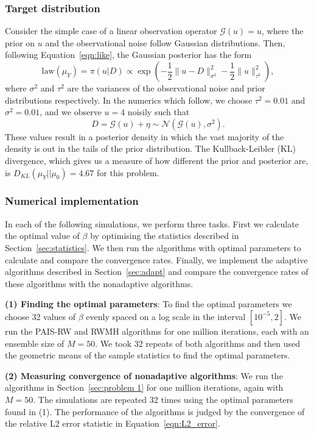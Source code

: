 \documentclass[final]{siamltex}
\newcommand{\G}{\mathcal{G}}
\begin{document}
\subsubsection{Target distribution}

Consider the simple case of a linear observation operator $\G(u) = u$, where the prior on $u$ and the observational noise follow Gaussian distributions. Then, following Equation~\ref{eqn:like}, the Gaussian posterior has the form
\begin{equation}\label{eqn:Gaussian posterior}
	\text{law}(\mu_Y) = \pi(u|D) \propto \exp\left(-\frac{1}{2}\big\|u - D\big\|^2_{\sigma^2} - \frac{1}{2}\big\|u\big\|^2_{\tau^2}\right),
\end{equation}
where $\sigma^2$ and $\tau^2$ are the variances of the
observational noise and prior distributions respectively. In the
numerics which follow, we choose $\tau^2 =0.01$ and $\sigma^2 = 0.01$, and
we observe $u=4$ noisily such that
\[
D = \mathcal{G}(u) + \eta \sim \mathcal{N}(\mathcal{G}(u),\sigma^2).
\]
These values result in a posterior density in which the vast majority
of the density is out in the tails of the
prior distribution. The Kullback-Leibler (KL)
divergence, which gives us a measure of how different the prior and
posterior are, is $D_{KL}(\mu_Y || \mu_0) = 4.67$ for this problem.

\subsubsection{Numerical implementation}\label{sec:Implementation P1}

In each of the following simulations, we perform three tasks. First we calculate the optimal value of $\beta$ by optimising the statistics described in Section~\ref{sec:statistics}. We then run the algorithms with optimal parameters to calculate and compare the convergence rates. Finally, we implement the adaptive algorithms described in Section~\ref{sec:adapt} and compare the convergence rates of these algorithms with the nonadaptive algorithms.

{\bf (1) Finding the optimal parameters}: To find the optimal
parameters we choose 32 values of $\beta$ evenly spaced on a log scale
in the interval $[10^{-5}, 2]$. We run the PAIS-RW and RWMH algorithms for one million iterations, each with an ensemble size of $M=50$. We took 32 repeats of both algorithms and then used the geometric means of the sample statistics to find the optimal parameters.

{\bf (2) Measuring convergence of nonadaptive algorithms}: We run the algorithms in Section~\ref{sec:problem 1} for one million iterations, again with $M=50$. The simulations are repeated 32 times using the optimal parameters found in (1). The performance of the algorithms is judged by the convergence of the relative L2 error statistic in Equation~\ref{eqn:L2_error}.
\end{document}
